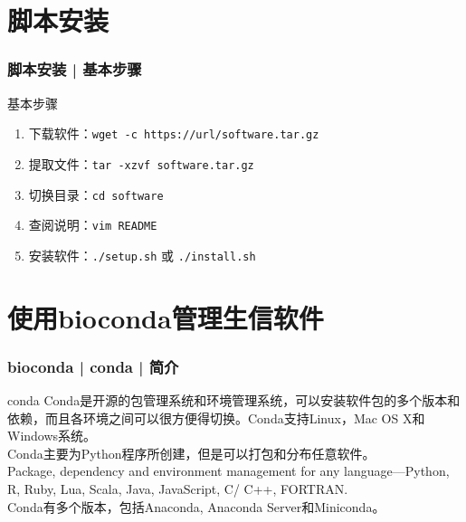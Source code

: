 \section{脚本安装}
\begin{frame}[fragile]
  \frametitle{脚本安装 | \alert{基本步骤}}
  \begin{block}{基本步骤}
    \begin{enumerate}
      \item 下载软件：\verb|wget -c https://url/software.tar.gz|
      \item 提取文件：\verb|tar -xzvf software.tar.gz|
      \item 切换目录：\verb|cd software|
      \item 查阅说明：\verb|vim README|
      \item 安装软件：\verb|./setup.sh| 或 \verb|./install.sh|
    \end{enumerate}
  \end{block}
\end{frame}

\section{使用bioconda管理生信软件}
\begin{frame}
  \frametitle{bioconda | conda | 简介}
  \begin{block}{conda}
    Conda是开源的包管理系统和环境管理系统，可以安装软件包的多个版本和依赖，而且各环境之间可以很方便得切换。Conda支持Linux，Mac OS X和Windows系统。\\
    \vspace{0.5em}
    Conda主要为Python程序所创建，但是可以打包和分布任意软件。\\
    Package, dependency and environment management for any language—Python, R, Ruby, Lua, Scala, Java, JavaScript, C/ C++, FORTRAN.\\
    \vspace{0.5em}
    Conda有多个版本，包括Anaconda, Anaconda Server和Miniconda。
  \end{block}
\end{frame}

